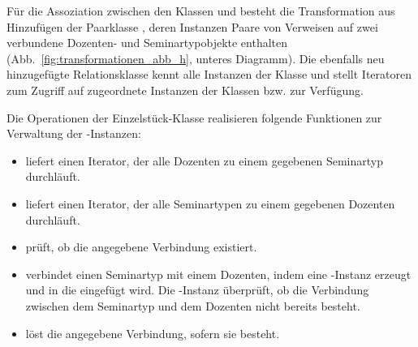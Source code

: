 \pagebreak %

Für die Assoziation zwischen den Klassen  und  besteht die Transformation aus Hinzufügen der Paarklasse , deren Instanzen Paare von Verweisen auf zwei verbundene Dozenten- und Seminartypobjekte enthalten (Abb.~\ref{fig:transformationen_abb_h}, unteres Diagramm). Die ebenfalls neu hinzugefügte Relationsklasse  kennt alle Instanzen der Klasse  und stellt Iteratoren zum Zugriff auf zugeordnete Instanzen der Klassen  bzw.  zur Verfügung.

\vspace{2mm} %

Die Operationen der Einzelstück-Klasse  realisieren folgende Funktionen zur Verwaltung der -Instanzen:

\vspace{2mm} %

\begin{itemize}
	\item {} liefert einen Iterator, der alle Dozenten zu einem gegebenen Seminartyp durchläuft.
	\item {} liefert einen Iterator, der alle Seminar\-typen zu einem gegebenen Dozenten durchläuft.
	\item {} prüft, ob die angegebene Verbindung existiert.
	\item {} verbindet einen Seminartyp mit einem 
	\linebreak %
	Dozenten, indem eine -Instanz erzeugt und in die  eingefügt wird. Die -Instanz überprüft, ob die Verbindung 
	\linebreak %
	zwischen dem Seminartyp und dem Dozenten nicht bereits besteht.
	\item {} löst die angegebene Verbindung, sofern sie 
	\linebreak %
	besteht.
\end{itemize}